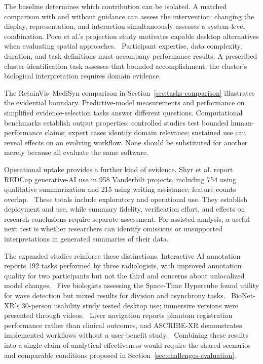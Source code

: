 The baseline determines which contribution can be isolated. A matched comparison with and without guidance can assess the intervention; changing the display, representation, and interaction simultaneously assesses a system-level combination. Poco et al.'s projection study motivates capable desktop alternatives when evaluating spatial approaches.~\cite{EvalPoco2011} Participant expertise, data complexity, duration, and task definitions must accompany performance results. A prescribed cluster-identification task assesses that bounded accomplishment; the cluster's biological interpretation requires domain evidence.

The RetainVis--MediSyn comparison in Section~\ref{sec:tasks-comparison} illustrates the evidential boundary. Predictive-model measurements and performance on simplified evidence-selection tasks answer different questions. Computational benchmarks establish output properties; controlled studies test bounded human-performance claims; expert cases identify domain relevance; sustained use can reveal effects on an evolving workflow. None should be substituted for another merely because all evaluate the same software.

Operational uptake provides a further kind of evidence. Shyr et al. report REDCap generative-AI use in 958 Vanderbilt projects, including 754 using qualitative summarization and 215 using writing assistance; feature counts overlap.~\cite{Shyr2026REDCapAI} These totals include exploratory and operational use. They establish deployment and use, while summary fidelity, verification effort, and effects on research conclusions require separate assessment. For assisted analysis, a useful next test is whether researchers can identify omissions or unsupported interpretations in generated summaries of their data.

The expanded studies reinforce these distinctions. Interactive AI annotation reports 192 tasks performed by three radiologists, with improved annotation quality for two participants but not the third and concerns about unlocalized model changes.~\cite{ExpandedE24} Five biologists assessing the Space-Time Hypercube found utility for wave detection but mixed results for division and asynchrony tasks.~\cite{ExpandedE22} BioNet-XR's 30-person usability study tested desktop use; immersive versions were presented through videos.~\cite{ExpandedE26} Liver navigation reports phantom registration performance rather than clinical outcomes, and ASCRIBE-XR demonstrates implemented workflows without a user-benefit study.~\cite{ExpandedE15,ExpandedE28} Combining these results into a single claim of analytical effectiveness would require the shared scenarios and comparable conditions proposed in Section~\ref{sec:challenges-evaluation}.

